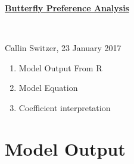 \documentclass{article}
\begin{document}
\noindent  \Large \textbf{\underline{Butterfly Preference Analysis}}

\normalsize

\ 

\noindent
Callin Switzer,
23 January 2017 

\begin{enumerate}[*]
  \item Model Output From R
  \item Model Equation
  \item Coefficient interpretation
\end{enumerate}



\section{Model Output}
\end{document}
